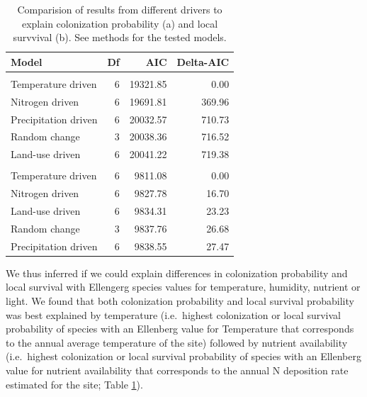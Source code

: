 \documentclass[fleqn,10pt,lineno]{wlpeerj} %
\begin{document}
\begin{table}

\caption{\label{tab:resdifeffects}Comparision of results from different drivers to explain colonization probability (a) and local survvival (b). See methods for the tested models.}
\centering
\begin{tabular}[t]{lrrr}
\toprule
Model & Df & AIC & Delta-AIC\\
\midrule
\addlinespace[0.3em]
\multicolumn{4}{l}{\textit{(a) Colonization probability}}\\
\hspace{1em}Temperature driven & 6 & 19321.85 & 0.00\\
\hspace{1em}Nitrogen driven & 6 & 19691.81 & 369.96\\
\hspace{1em}Precipitation driven & 6 & 20032.57 & 710.73\\
\hspace{1em}Random change & 3 & 20038.36 & 716.52\\
\hspace{1em}Land-use driven & 6 & 20041.22 & 719.38\\
\addlinespace[0.3em]
\multicolumn{4}{l}{\textit{(b) Local survival probability}}\\
\hspace{1em}Temperature driven & 6 & 9811.08 & 0.00\\
\hspace{1em}Nitrogen driven & 6 & 9827.78 & 16.70\\
\hspace{1em}Land-use driven & 6 & 9834.31 & 23.23\\
\hspace{1em}Random change & 3 & 9837.76 & 26.68\\
\hspace{1em}Precipitation driven & 6 & 9838.55 & 27.47\\
\bottomrule
\end{tabular}
\end{table}

We thus inferred if we could explain differences in colonization
probability and local survival with Ellengerg species values for
temperature, humidity, nutrient or light. We found that both
colonization probability and local survival probability was best
explained by temperature (i.e.~highest colonization or local survival
probability of species with an Ellenberg value for Temperature that
corresponds to the annual average temperature of the site) followed by
nutrient availability (i.e.~highest colonization or local survival
probability of species with an Ellenberg value for nutrient availability
that corresponds to the annual N deposition rate estimated for the site;
Table \ref{tab:resdifeffects}).
\end{document}
